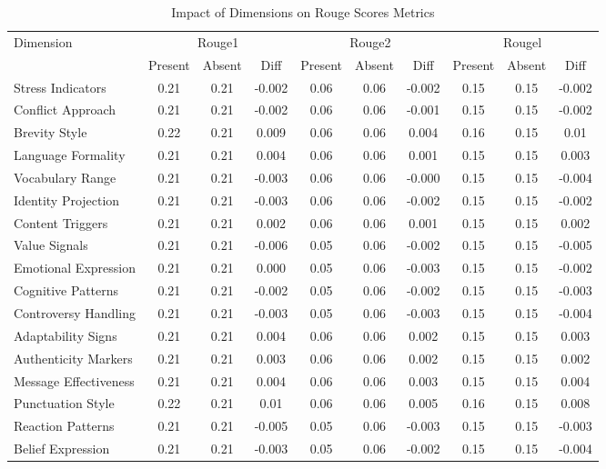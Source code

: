 \begin{table}
\caption{Impact of Dimensions on Rouge Scores Metrics}
\label{table1}
\begin{tabular}{lccccccccc}
\hline
\multirow{2}{*}{Dimension} & \multicolumn{3}{c}{Rouge1} & \multicolumn{3}{c}{Rouge2} & \multicolumn{3}{c}{Rougel} \\
 & Present & Absent & Diff & Present & Absent & Diff & Present & Absent & Diff \\
\hline
Stress Indicators & 0.21 & 0.21 & -0.002 & 0.06 & 0.06 & -0.002 & 0.15 & 0.15 & -0.002 \\
Conflict Approach & 0.21 & 0.21 & -0.002 & 0.06 & 0.06 & -0.001 & 0.15 & 0.15 & -0.002 \\
Brevity Style & 0.22 & 0.21 & 0.009 & 0.06 & 0.06 & 0.004 & 0.16 & 0.15 & 0.01 \\
Language Formality & 0.21 & 0.21 & 0.004 & 0.06 & 0.06 & 0.001 & 0.15 & 0.15 & 0.003 \\
Vocabulary Range & 0.21 & 0.21 & -0.003 & 0.06 & 0.06 & -0.000 & 0.15 & 0.15 & -0.004 \\
Identity Projection & 0.21 & 0.21 & -0.003 & 0.06 & 0.06 & -0.002 & 0.15 & 0.15 & -0.002 \\
Content Triggers & 0.21 & 0.21 & 0.002 & 0.06 & 0.06 & 0.001 & 0.15 & 0.15 & 0.002 \\
Value Signals & 0.21 & 0.21 & -0.006 & 0.05 & 0.06 & -0.002 & 0.15 & 0.15 & -0.005 \\
Emotional Expression & 0.21 & 0.21 & 0.000 & 0.05 & 0.06 & -0.003 & 0.15 & 0.15 & -0.002 \\
Cognitive Patterns & 0.21 & 0.21 & -0.002 & 0.05 & 0.06 & -0.002 & 0.15 & 0.15 & -0.003 \\
Controversy Handling & 0.21 & 0.21 & -0.003 & 0.05 & 0.06 & -0.003 & 0.15 & 0.15 & -0.004 \\
Adaptability Signs & 0.21 & 0.21 & 0.004 & 0.06 & 0.06 & 0.002 & 0.15 & 0.15 & 0.003 \\
Authenticity Markers & 0.21 & 0.21 & 0.003 & 0.06 & 0.06 & 0.002 & 0.15 & 0.15 & 0.002 \\
Message Effectiveness & 0.21 & 0.21 & 0.004 & 0.06 & 0.06 & 0.003 & 0.15 & 0.15 & 0.004 \\
Punctuation Style & 0.22 & 0.21 & 0.01 & 0.06 & 0.06 & 0.005 & 0.16 & 0.15 & 0.008 \\
Reaction Patterns & 0.21 & 0.21 & -0.005 & 0.05 & 0.06 & -0.003 & 0.15 & 0.15 & -0.003 \\
Belief Expression & 0.21 & 0.21 & -0.003 & 0.05 & 0.06 & -0.002 & 0.15 & 0.15 & -0.004 \\

\end{tabular}
\end{table}
